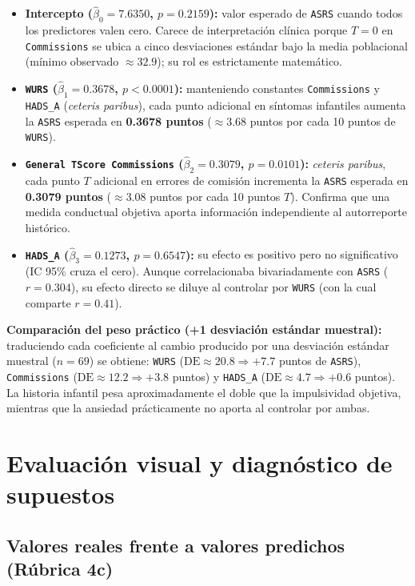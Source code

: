 \documentclass[11pt,letterpaper]{article}
\begin{document}
\begin{itemize}
  \item \textbf{Intercepto ($\hat{\beta}_0 = 7.6350$, $p = 0.2159$):} valor esperado de \texttt{ASRS} cuando todos los predictores valen cero. Carece de interpretación clínica porque $T = 0$ en \texttt{Commissions} se ubica a cinco desviaciones estándar bajo la media poblacional (mínimo observado $\approx 32.9$); su rol es estrictamente matemático.
  \item \textbf{\texttt{WURS} ($\hat{\beta}_1 = 0.3678$, $p < 0.0001$):} manteniendo constantes \texttt{Commissions} y \texttt{HADS\_A} (\textit{ceteris paribus}), cada punto adicional en síntomas infantiles aumenta la \texttt{ASRS} esperada en \textbf{0.3678 puntos} ($\approx 3.68$ puntos por cada 10 puntos de \texttt{WURS}).
  \item \textbf{\texttt{General TScore Commissions} ($\hat{\beta}_2 = 0.3079$, $p = 0.0101$):} \textit{ceteris paribus}, cada punto $T$ adicional en errores de comisión incrementa la \texttt{ASRS} esperada en \textbf{0.3079 puntos} ($\approx 3.08$ puntos por cada 10 puntos $T$). Confirma que una medida conductual objetiva aporta información independiente al autorreporte histórico.
  \item \textbf{\texttt{HADS\_A} ($\hat{\beta}_3 = 0.1273$, $p = 0.6547$):} su efecto es positivo pero no significativo (IC 95\% cruza el cero). Aunque correlacionaba bivariadamente con \texttt{ASRS} ($r = 0.304$), su efecto directo se diluye al controlar por \texttt{WURS} (con la cual comparte $r = 0.41$).
\end{itemize}

\textbf{Comparación del peso práctico (+1 desviación estándar muestral):} traduciendo cada coeficiente al cambio producido por una desviación estándar muestral ($n = 69$) se obtiene: \texttt{WURS} ($\text{DE} \approx 20.8 \Rightarrow +7.7$ puntos de \texttt{ASRS}), \texttt{Commissions} ($\text{DE} \approx 12.2 \Rightarrow +3.8$ puntos) y \texttt{HADS\_A} ($\text{DE} \approx 4.7 \Rightarrow +0.6$ puntos). La historia infantil pesa aproximadamente el doble que la impulsividad objetiva, mientras que la ansiedad prácticamente no aporta al controlar por ambas.

\section{Evaluación visual y diagnóstico de supuestos}

\subsection{Valores reales frente a valores predichos (Rúbrica 4c)}
\end{document}
